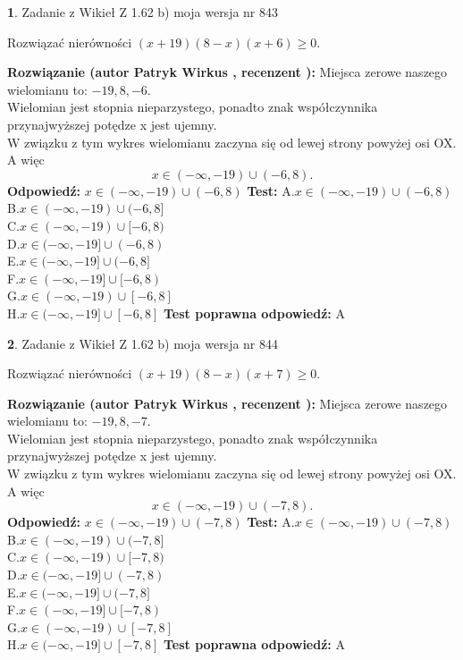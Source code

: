 \documentclass[12pt, a4paper]{article}
\theoremstyle{definition} %
\newtheorem{zad}{}
\newcommand{\zadStart}[1]{\begin{zad}#1\newline}
\newcommand{\zadStop}{\end{zad}}
\newcommand{\rozwStart}[2]{\noindent \textbf{Rozwiązanie (autor #1 , recenzent #2): }\newline}
\newcommand{\rozwStop}{\newline}
\newcommand{\odpStart}{\noindent \textbf{Odpowiedź:}\newline}
\newcommand{\odpStop}{\newline}
\newcommand{\testStart}{\noindent \textbf{Test:}\newline}
\newcommand{\testStop}{\newline}
\newcommand{\kluczStart}{\noindent \textbf{Test poprawna odpowiedź:}\newline}
\newcommand{\kluczStop}{\newline}
\begin{document}
\zadStart{Zadanie z Wikieł Z 1.62 b) moja wersja nr 843}

Rozwiązać nierówności $(x+19)(8-x)(x+6)\ge0$.
\zadStop
\rozwStart{Patryk Wirkus}{}
Miejsca zerowe naszego wielomianu to: $-19, 8, -6$.\\
Wielomian jest stopnia nieparzystego, ponadto znak współczynnika przy\linebreak najwyższej potędze x jest ujemny.\\ W związku z tym wykres wielomianu zaczyna się od lewej strony powyżej osi OX. A więc $$x \in (-\infty,-19) \cup (-6,8).$$
\rozwStop
\odpStart
$x \in (-\infty,-19) \cup (-6,8)$
\odpStop
\testStart
A.$x \in (-\infty,-19) \cup (-6,8)$\\
B.$x \in (-\infty,-19) \cup (-6,8]$\\
C.$x \in (-\infty,-19) \cup [-6,8)$\\
D.$x \in (-\infty,-19] \cup (-6,8)$\\
E.$x \in (-\infty,-19] \cup (-6,8]$\\
F.$x \in (-\infty,-19] \cup [-6,8)$\\
G.$x \in (-\infty,-19) \cup [-6,8]$\\
H.$x \in (-\infty,-19] \cup [-6,8]$
\testStop
\kluczStart
A
\kluczStop



\zadStart{Zadanie z Wikieł Z 1.62 b) moja wersja nr 844}

Rozwiązać nierówności $(x+19)(8-x)(x+7)\ge0$.
\zadStop
\rozwStart{Patryk Wirkus}{}
Miejsca zerowe naszego wielomianu to: $-19, 8, -7$.\\
Wielomian jest stopnia nieparzystego, ponadto znak współczynnika przy\linebreak najwyższej potędze x jest ujemny.\\ W związku z tym wykres wielomianu zaczyna się od lewej strony powyżej osi OX. A więc $$x \in (-\infty,-19) \cup (-7,8).$$
\rozwStop
\odpStart
$x \in (-\infty,-19) \cup (-7,8)$
\odpStop
\testStart
A.$x \in (-\infty,-19) \cup (-7,8)$\\
B.$x \in (-\infty,-19) \cup (-7,8]$\\
C.$x \in (-\infty,-19) \cup [-7,8)$\\
D.$x \in (-\infty,-19] \cup (-7,8)$\\
E.$x \in (-\infty,-19] \cup (-7,8]$\\
F.$x \in (-\infty,-19] \cup [-7,8)$\\
G.$x \in (-\infty,-19) \cup [-7,8]$\\
H.$x \in (-\infty,-19] \cup [-7,8]$
\testStop
\kluczStart
A
\kluczStop
\end{document}
